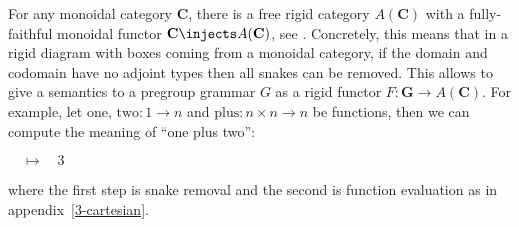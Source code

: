 \begin{example}
For any monoidal category $\mathbf{C}$, there is a free rigid category $A(\mathbf{C})$ with a fully-faithful monoidal functor $\mathbf{C} \injects A(\mathbf{C})$, see \cite{Delpeuch14a}.
Concretely, this means that in a rigid diagram with boxes coming from a monoidal category, if the domain and codomain have no adjoint types then all snakes can be removed.
This allows to give a semantics to a pregroup grammar $G$ as a rigid functor $F : \mathbf{G} \to A(\mathbf{C})$.
For example, let $\text{one, two} : 1 \to n$ and $\text{plus} : n \times n \to n$ be functions, then we can compute the meaning of ``one plus two'':
\begin{center}
 $\quad \mapsto \quad 3$
\end{center}
where the first step is snake removal and the second is function evaluation as in appendix~\ref{3-cartesian}.
\end{example}
